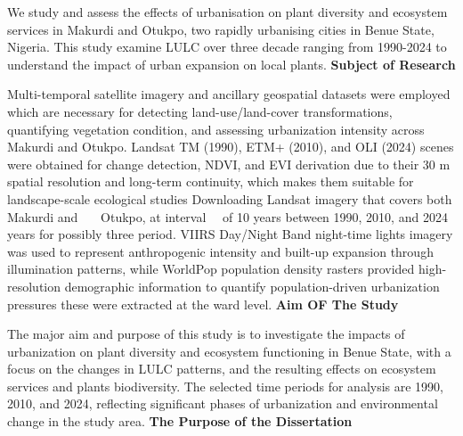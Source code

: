 We study and assess the effects of urbanisation on plant diversity and ecosystem services in Makurdi and Otukpo, two rapidly urbanising cities in Benue State, Nigeria. This study examine LULC over three decade ranging from 1990-2024 to understand the impact of urban expansion on local plants.
{}\textbf{Subject of Research}

Multi-temporal satellite imagery and ancillary geospatial datasets were employed which are necessary for detecting land-use/land-cover transformations, quantifying vegetation condition, and assessing urbanization intensity across Makurdi and Otukpo. Landsat TM (1990), ETM+ (2010), and OLI (2024) scenes were obtained for change detection, NDVI, and EVI derivation due to their 30 m spatial resolution and long-term continuity, which makes them suitable for landscape-scale ecological studies Downloading Landsat imagery that covers both Makurdi and~~~ Otukpo, at interval~~ of 10 years between 1990, 2010, and 2024 years for possibly three period. VIIRS Day/Night Band night-time lights imagery was used to represent anthropogenic intensity and built-up expansion through illumination patterns, while WorldPop population density rasters provided high-resolution demographic information to quantify population-driven urbanization pressures these were extracted at the ward level.
{}\textbf{Aim OF The Study}

The major aim and purpose of this study is to investigate the impacts of urbanization on plant diversity and ecosystem functioning in Benue State, with a focus on the changes in LULC patterns, and the resulting effects on ecosystem services and plants biodiversity. The selected time periods for analysis are 1990, 2010, and 2024, reflecting significant phases of urbanization and environmental change in the study area.
{}\textbf{The Purpose of the Dissertation}

